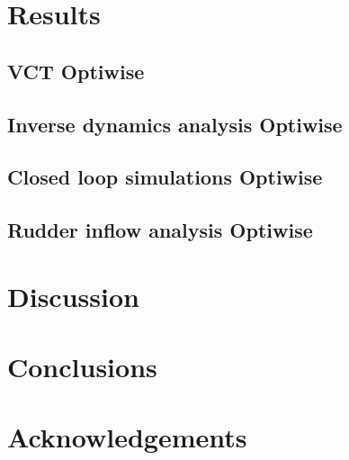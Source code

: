\documentclass[preprint,12pt,authoryear]{elsarticle}
\begin{document}
\section{Results}
\label{sec:results}
%
\FloatBarrier

%

%
%

\subsection{VCT Optiwise}

\FloatBarrier

\subsection{Inverse dynamics analysis Optiwise}

\FloatBarrier
\subsection{Closed loop simulations Optiwise}

\FloatBarrier

\subsection{Rudder inflow analysis Optiwise}

\FloatBarrier

\section{Discussion}
\label{sec:discussion}


\section{Conclusions}
\label{sec:conclusions}

\FloatBarrier

\section{Acknowledgements}


\appendix


\FloatBarrier
\pagebreak


\end{document}
